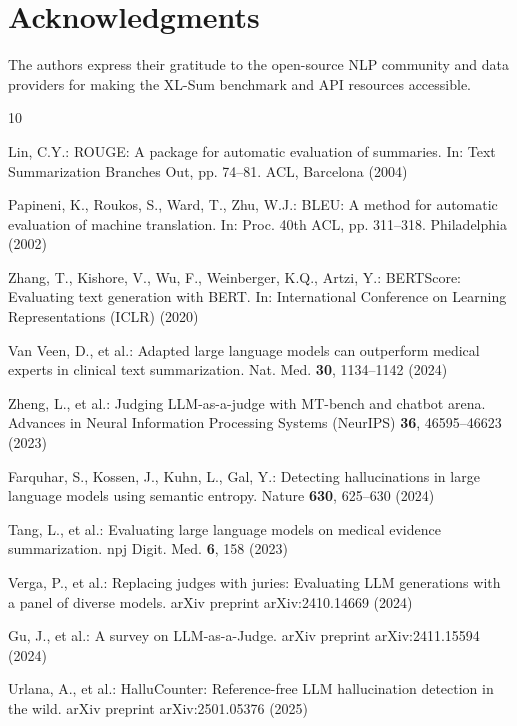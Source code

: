 \documentclass[runningheads]{llncs}
\begin{document}
\section*{Acknowledgments}
The authors express their gratitude to the open-source NLP community and data providers for making the XL-Sum benchmark and API resources accessible.

%
%
\begin{thebibliography}{10}

Lin, C.Y.: ROUGE: A package for automatic evaluation of summaries. In: Text Summarization Branches Out, pp. 74--81. ACL, Barcelona (2004)

Papineni, K., Roukos, S., Ward, T., Zhu, W.J.: BLEU: A method for automatic evaluation of machine translation. In: Proc. 40th ACL, pp. 311--318. Philadelphia (2002)

Zhang, T., Kishore, V., Wu, F., Weinberger, K.Q., Artzi, Y.: BERTScore: Evaluating text generation with BERT. In: International Conference on Learning Representations (ICLR) (2020)

Van Veen, D., et al.: Adapted large language models can outperform medical experts in clinical text summarization. Nat. Med. \textbf{30}, 1134--1142 (2024)

Zheng, L., et al.: Judging LLM-as-a-judge with MT-bench and chatbot arena. Advances in Neural Information Processing Systems (NeurIPS) \textbf{36}, 46595--46623 (2023)

Farquhar, S., Kossen, J., Kuhn, L., Gal, Y.: Detecting hallucinations in large language models using semantic entropy. Nature \textbf{630}, 625--630 (2024)

Tang, L., et al.: Evaluating large language models on medical evidence summarization. npj Digit. Med. \textbf{6}, 158 (2023)

Verga, P., et al.: Replacing judges with juries: Evaluating LLM generations with a panel of diverse models. arXiv preprint arXiv:2410.14669 (2024)

Gu, J., et al.: A survey on LLM-as-a-Judge. arXiv preprint arXiv:2411.15594 (2024)

Urlana, A., et al.: HalluCounter: Reference-free LLM hallucination detection in the wild. arXiv preprint arXiv:2501.05376 (2025)

\end{thebibliography}
\end{document}
